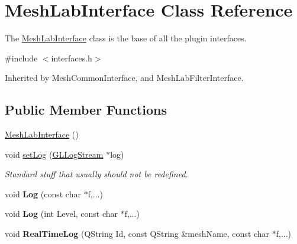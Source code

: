 \hypertarget{class_mesh_lab_interface}{}\section{Mesh\+Lab\+Interface Class Reference}
\label{class_mesh_lab_interface}


The \hyperlink{class_mesh_lab_interface}{Mesh\+Lab\+Interface} class is the base of all the plugin interfaces.  




{\ttfamily \#include $<$interfaces.\+h$>$}



Inherited by Mesh\+Common\+Interface, and Mesh\+Lab\+Filter\+Interface.

\subsection*{Public Member Functions}
\begin{DoxyCompactItemize}
\item 
\hyperlink{class_mesh_lab_interface_a233eea4713fe11e32e59294016c46f0f}{Mesh\+Lab\+Interface} ()
\item 
\mbox{\label{class_mesh_lab_interface_a4c6c9ee0c7771a3e1303b0177d1fdbfa}} 
void \hyperlink{class_mesh_lab_interface_a4c6c9ee0c7771a3e1303b0177d1fdbfa}{set\+Log} (\hyperlink{class_g_l_log_stream}{G\+L\+Log\+Stream} $\ast$log)
\begin{DoxyCompactList}\small\item\em Standard stuff that usually should not be redefined. \end{DoxyCompactList}\item 
\mbox{\label{class_mesh_lab_interface_a8026b1d0a00d0084e7d9e6d18445e729}} 
void {\bfseries Log} (const char $\ast$f,...)
\item 
\mbox{\label{class_mesh_lab_interface_ab70404da3f9e897d0613cd983723d28e}} 
void {\bfseries Log} (int Level, const char $\ast$f,...)
\item 
\mbox{\label{class_mesh_lab_interface_aee2a5085477341b12ca905f8e7616570}} 
void {\bfseries Real\+Time\+Log} (Q\+String Id, const Q\+String \&mesh\+Name, const char $\ast$f,...)
\end{DoxyCompactItemize}


